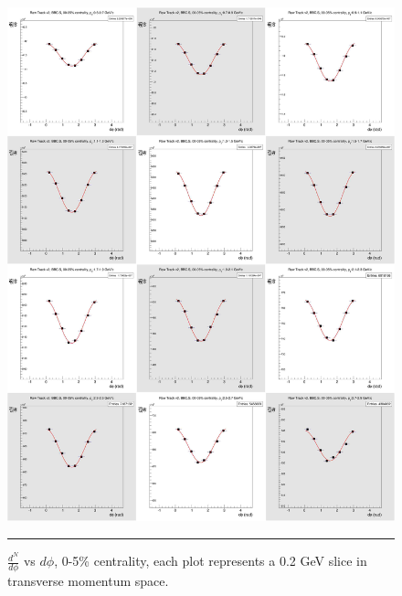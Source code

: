 \begin{figure}[htbp!]
  \centering
    \includegraphics[width=1\textwidth]{chargedtrackv2/htrkdphi2bbcs_0.jpg}
    \rule{35em}{0.5pt}
  \caption[$\frac{dN}{d\phi}$ vs $d\phi$, 0-5\% centrality.]{$\frac{d^N}{d\phi}$ vs $d\phi$, 0-5\% centrality, each plot represents a 0.2 GeV slice in transverse momentum space.}
  \label{fig:Ndphicent0}
\end{figure}

